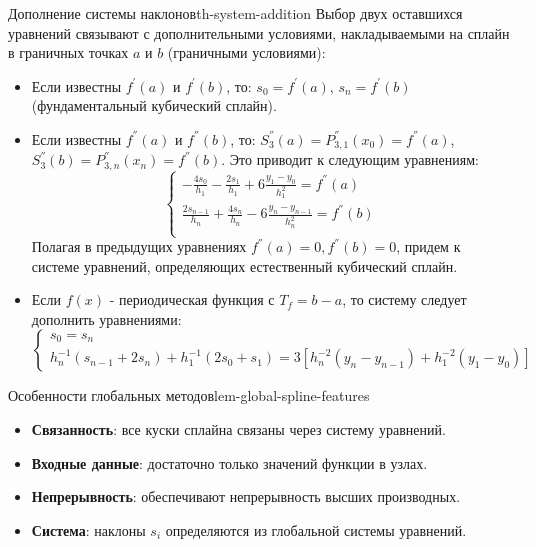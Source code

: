 \documentclass[14pt]{extarticle}
\begin{document}
    \clearpage
    \begin{theorem}{Дополнение системы наклонов}{th-system-addition}
        Выбор двух оставшихся уравнений связывают с дополнительными условиями, накладываемыми на сплайн в граничных точках $a$ и $b$ (граничными условиями):
        \begin{itemize}
            \item Если известны $f^{'}(a)$ и $f^{'}(b)$, то: $s_{0} = f^{'}(a)$, $s_{n} = f^{'}(b)$ (фундаментальный кубический сплайн).
            \item Если известны $f^{''}(a)$ и $f^{''}(b)$, то: $S_{3}^{''}(a) = P_{3,1}^{''}(x_{0}) = f^{''}(a)$, $S_{3}^{''}(b) = P_{3, n}^{''}(x_{n}) = f^{''}(b)$. Это приводит к следующим уравнениям:
                  $$
                  \begin{cases}
                      -\frac{4s_{0}}{h_{1}} - \frac{2s_{1}}{h_{1}} + 6\frac{y_{1} - y_{0}}{h_{1}^{2}} = f^{''}(a)\\
                      \frac{2s_{n-1}}{h_{n}} + \frac{4s_{n}}{h_{n}} - 6\frac{y_{n} - y_{n - 1}}{h_{n}^{2}} = f^{''}(b)\\
                  \end{cases}
                  $$
                Полагая в предыдущих уравнениях $f^{''}(a) = 0, f^{''}(b) = 0$, придем к системе уравнений, определяющих естественный кубический сплайн.
            \item Если $f(x)$ - периодическая функция с $T_{f} = b - a$, то систему следует дополнить уравнениями:
                  $$
                  \begin{cases}
                      s_{0} = s_{n}\\
                      h_{n}^{-1}(s_{n - 1} + 2s_{n}) + h_{1}^{-1}(2s_{0} + s_{1}) = 3[h_{n}^{-2}(y_{n} - y_{n - 1}) + h_{1}^{-2}(y_{1} - y_{0})]
                  \end{cases}
                  $$
        \end{itemize}

    \end{theorem}

    \begin{lemma}{Особенности глобальных методов}{lem-global-spline-features}
        \begin{itemize}
            \item \textbf{Связанность}: все куски сплайна связаны через систему уравнений.
            \item \textbf{Входные данные}: достаточно только значений функции в узлах.
            \item \textbf{Непрерывность}: обеспечивают непрерывность высших производных.
            \item \textbf{Система}: наклоны $s_{i}$ определяются из глобальной системы уравнений.
        \end{itemize}
    \end{lemma}
\end{document}
